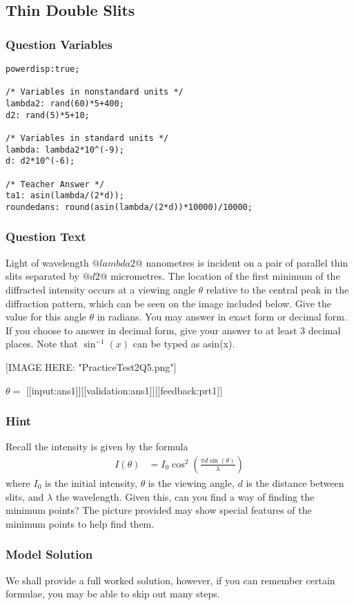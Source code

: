 \documentclass[a4paper,10pt]{article}
\begin{document}
\subsection{Thin Double Slits}
\subsubsection{Question Variables}
\begin{lstlisting}
powerdisp:true;

/* Variables in nonstandard units */
lambda2: rand(60)*5+400;
d2: rand(5)*5+10;

/* Variables in standard units */
lambda: lambda2*10^(-9);
d: d2*10^(-6);

/* Teacher Answer */
ta1: asin(lambda/(2*d));
roundedans: round(asin(lambda/(2*d))*10000)/10000;
\end{lstlisting}
\subsubsection{Question Text}
Light of wavelength \(@lambda2@\) nanometres is incident on a pair of parallel thin slits separated by \(@d2@\) micrometres. The location of the first minimum of the diffracted intensity occurs at a viewing angle \(\theta\) relative to the central peak in the diffraction pattern, which can be seen on the image included below. Give the value for this angle \(\theta\) in radians. You may answer in exact form or decimal form. If you choose to answer in decimal form, give your answer to at least 3 decimal places. Note that \(\sin^{-1}(x)\) can be typed as asin(x). 

[IMAGE HERE: "PracticeTest2Q5.png"]

\(\theta = \) [[input:ans1]][[validation:ans1]][[feedback:prt1]]
\subsubsection{Hint}
Recall the intensity is given by the formula \begin{align*} I(\theta) &= I_0\cos^2\left(\frac{ \pi d \sin(\theta)}{\lambda} \right) \end{align*} where \(I_0\) is the initial intensity, \(\theta\) is the viewing angle, \(d\) is the distance between slits, and \(\lambda\) the wavelength. Given this, can you find a way of finding the minimum points? The picture provided may show special features of the minimum points to help find them.
\subsubsection{Model Solution}
We shall provide a full worked solution, however, if you can remember certain formulae, you may be able to skip out many steps.
\end{document}
